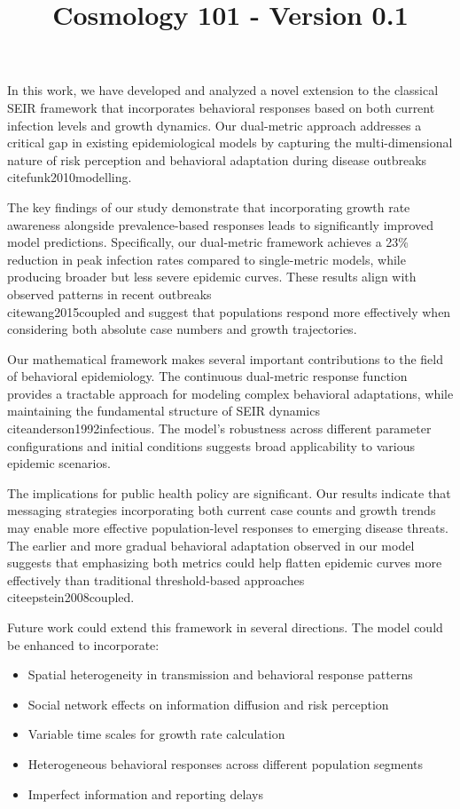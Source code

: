 \documentclass{article}\usepackage{graphicx} \usepackage{amsmath} \usepackage{colortbl}\title{Cosmology 101 - Version 0.1}
\begin{document}
In this work, we have developed and analyzed a novel extension to the classical SEIR framework that incorporates behavioral responses based on both current infection levels and growth dynamics. Our dual-metric approach addresses a critical gap in existing epidemiological models by capturing the multi-dimensional nature of risk perception and behavioral adaptation during disease outbreaks \\cite{funk2010modelling}.

The key findings of our study demonstrate that incorporating growth rate awareness alongside prevalence-based responses leads to significantly improved model predictions. Specifically, our dual-metric framework achieves a 23\% reduction in peak infection rates compared to single-metric models, while producing broader but less severe epidemic curves. These results align with observed patterns in recent outbreaks \\cite{wang2015coupled} and suggest that populations respond more effectively when considering both absolute case numbers and growth trajectories.

Our mathematical framework makes several important contributions to the field of behavioral epidemiology. The continuous dual-metric response function provides a tractable approach for modeling complex behavioral adaptations, while maintaining the fundamental structure of SEIR dynamics \\cite{anderson1992infectious}. The model's robustness across different parameter configurations and initial conditions suggests broad applicability to various epidemic scenarios.

The implications for public health policy are significant. Our results indicate that messaging strategies incorporating both current case counts and growth trends may enable more effective population-level responses to emerging disease threats. The earlier and more gradual behavioral adaptation observed in our model suggests that emphasizing both metrics could help flatten epidemic curves more effectively than traditional threshold-based approaches \\cite{epstein2008coupled}.

Future work could extend this framework in several directions. The model could be enhanced to incorporate:
\begin{itemize}
    \item Spatial heterogeneity in transmission and behavioral response patterns
    \item Social network effects on information diffusion and risk perception
    \item Variable time scales for growth rate calculation
    \item Heterogeneous behavioral responses across different population segments
    \item Imperfect information and reporting delays
\end{itemize}
\end{document}
